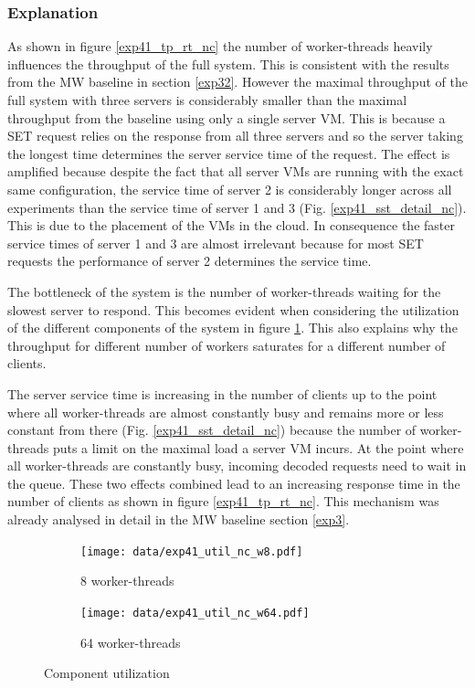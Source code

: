 \documentclass[report.tex]{subfiles}
\begin{document}
\subsubsection{Explanation}

As shown in figure \ref{exp41_tp_rt_nc} the number of worker-threads heavily influences the throughput of the full system. This is consistent with the results from the MW baseline in section \ref{exp32}.
However the maximal throughput of the full system with three servers is considerably smaller than the maximal throughput from the baseline using only a single server VM. This is because a SET request relies on the response from all three servers and so the server taking the longest time determines the server service time of the request.
The effect is amplified because despite the fact that all server VMs are running with the exact same configuration, the service time of server 2 is considerably longer across all experiments than the service time of server 1 and 3 (Fig. \ref{exp41_sst_detail_nc}). This is due to the placement of the VMs in the cloud. 
In consequence the faster service times of server 1 and 3 are almost irrelevant because for most SET requests the performance of server 2 determines the service time.

The bottleneck of the system is the number of worker-threads waiting for the slowest server to respond.
This becomes evident when considering the utilization of the different components of the system in figure \ref{exp41_util_nc}. This also explains why the throughput for different number of workers saturates for a different number of clients.

The server service time is increasing in the number of clients up to the point where all worker-threads are almost constantly busy and remains more or less constant from there (Fig. \ref{exp41_sst_detail_nc}) because the number of worker-threads puts a limit on the maximal load a server VM incurs. At the point where all worker-threads are constantly busy, incoming decoded requests need to wait in the queue. These two effects combined lead to an increasing response time in the number of clients as shown in figure \ref{exp41_tp_rt_nc}. This mechanism was already analysed in detail in the MW baseline section \ref{exp3}.


\begin{figure}[H]
	\begin{subfigure}[b]{.49\linewidth}
		\centering
		\texttt{[image: data/exp41\_util\_nc\_w8.pdf]}
		\caption{8 worker-threads}
	\end{subfigure}\hfill
	\begin{subfigure}[b]{.49\linewidth}
		\centering
		\texttt{[image: data/exp41\_util\_nc\_w64.pdf]}
		\caption{64 worker-threads}
	\end{subfigure}%
	\caption{Component utilization}\label{exp41_util_nc}
\end{figure}
\end{document}
